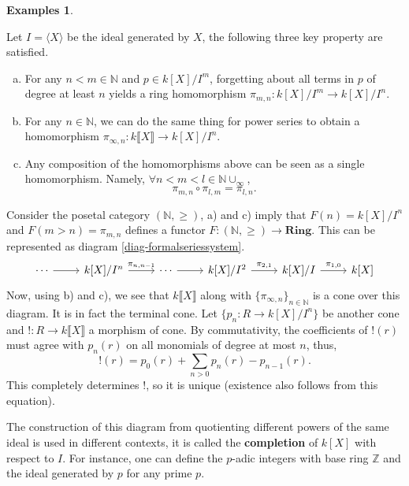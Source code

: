 \documentclass{article}
\theoremstyle{definition}
\newtheorem{exmps}[thm]{Examples}
\theoremstyle{remark}
\newcommand{\N}{\mathbb{N}}
\newcommand{\Z}{\mathbb{Z}}
\begin{document}
\begin{exmps}
\begin{enumerate}
        Let $I = \langle X \rangle$ be the ideal generated by $X$, the following three key property are satisfied.
        \begin{enumerate}[a)]
            \item For any $n < m \in \N$ and $p \in k[X]/I^m$, forgetting about all terms in $p$ of degree at least $n$ yields a ring homomorphism $\pi_{m,n}: k[X]/I^m \rightarrow k[X]/I^n$.
            \item For any $n \in \N$, we can do the same thing for power series to obtain a homomorphism $\pi_{\infty,n}: k\llbracket X \rrbracket \rightarrow k[X]/I^n$.
            \item Any composition of the homomorphisms above can be seen as a single homomorphism. Namely, $\forall n < m < l \in \N \cup_{\infty}$, \[\pi_{m,n} \circ \pi_{l,m} = \pi_{l,n}.\]
        \end{enumerate}
        Consider the posetal category $(\N, \geq)$, a) and c) imply that $F(n) = k[X]/I^n$ and $F(m>n) = \pi_{m,n}$ defines a functor $F: (\N, \geq) \rightarrow \textbf{Ring}$. This can be represented as diagram \eqref{diag-formalseriessystem}.
        \begin{equation}\label{diag-formalseriessystem}
            \begin{tikzcd}
                \cdots \arrow[r] & {k[X]/I^n} \arrow[r, "{\pi_{n,n-1}}"] & \cdots \arrow[r] & {k[X]/I^2} \arrow[r, "{\pi_{2,1}}"] & {k[X]/I} \arrow[r, "{\pi_{1,0}}"] & {k[X]}
            \end{tikzcd}
        \end{equation}
        Now, using b) and c), we see that $k\llbracket X \rrbracket$ along with $\{\pi_{\infty,n}\}_{n\in \N}$ is a cone over this diagram. It is in fact the terminal cone. Let $\{p_n: R \rightarrow k[X]/I^n\}$ be another cone and $!:R \rightarrow k\llbracket X \rrbracket$ a morphism of cone. By commutativity, the coefficients of $!(r)$ must agree with $p_n(r)$ on all monomials of degree at most $n$, thus,
        \[!(r) = p_0(r) + \sum_{n > 0} p_n(r) - p_{n-1}(r).\]
        This completely determines $!$, so it is unique (existence also follows from this equation).

        The construction of this diagram from quotienting different powers of the same ideal is used in different contexts, it is called the \textbf{completion} of $k[X]$ with respect to $I$. For instance, one can define the $p$-adic integers with base ring $\Z$ and the ideal generated by $p$ for any prime $p$.
    \end{enumerate}
\end{exmps}
\end{document}
